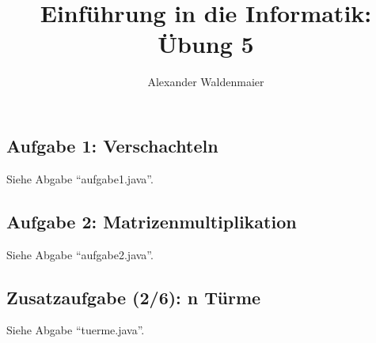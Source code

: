 \documentclass{article}
\title{Einführung in die Informatik: Übung 5}
\author{Alexander Waldenmaier}
\begin{document}
    \maketitle

    \subsection*{Aufgabe 1: Verschachteln}
    Siehe Abgabe "`aufgabe1.java"'.

    \subsection*{Aufgabe 2: Matrizenmultiplikation}
    Siehe Abgabe "`aufgabe2.java"'.

    \subsection*{Zusatzaufgabe (2/6): n Türme}
    Siehe Abgabe "`tuerme.java"'.
\end{document}
